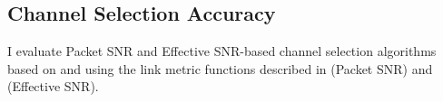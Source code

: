 %
%
%

\subsection{Channel Selection Accuracy}
I evaluate Packet SNR and Effective SNR-based channel selection algorithms based on  and using the link metric functions described in  (Packet SNR) and  (Effective SNR).

